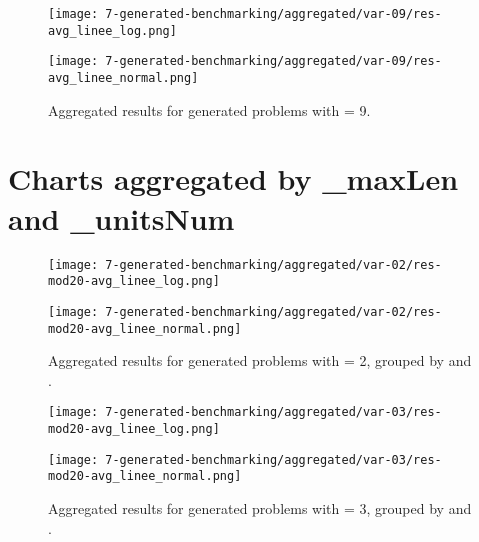 \begin{appendices}
\begin{figure}[H]
  \centering
  \begin{minipage}{1\textwidth}
    \centering
    \texttt{[image: 7-generated-benchmarking/aggregated/var-09/res-avg\_linee\_log.png]}
  \end{minipage}
  \hfill
  \begin{minipage}{1\textwidth}
    \centering
    \texttt{[image: 7-generated-benchmarking/aggregated/var-09/res-avg\_linee\_normal.png]}
  \end{minipage}
  \caption{Aggregated results for generated problems with  = 9.}\label{fig:app-agg-var9}
\end{figure}

\section{Charts aggregated by \_maxLen and \_unitsNum}\label{app:charts-by-maxlen-unitsnum}
\begin{figure}[H]
  \centering
  \begin{minipage}{1\textwidth}
    \centering
    \texttt{[image: 7-generated-benchmarking/aggregated/var-02/res-mod20-avg\_linee\_log.png]}
  \end{minipage}
  \hfill
  \begin{minipage}{1\textwidth}
    \centering
    \texttt{[image: 7-generated-benchmarking/aggregated/var-02/res-mod20-avg\_linee\_normal.png]}
  \end{minipage}
  \caption{Aggregated results for generated problems with  = 2, grouped by  and .}\label{fig:app-agg-var2-mod20}
\end{figure}

\begin{figure}[H]
  \centering
  \begin{minipage}{1\textwidth}
    \centering
    \texttt{[image: 7-generated-benchmarking/aggregated/var-03/res-mod20-avg\_linee\_log.png]}
  \end{minipage}
  \hfill
  \begin{minipage}{1\textwidth}
    \centering
    \texttt{[image: 7-generated-benchmarking/aggregated/var-03/res-mod20-avg\_linee\_normal.png]}
  \end{minipage}
  \caption{Aggregated results for generated problems with  = 3, grouped by  and .}\label{fig:app-agg-var3-mod20}
\end{figure}


\end{appendices}
